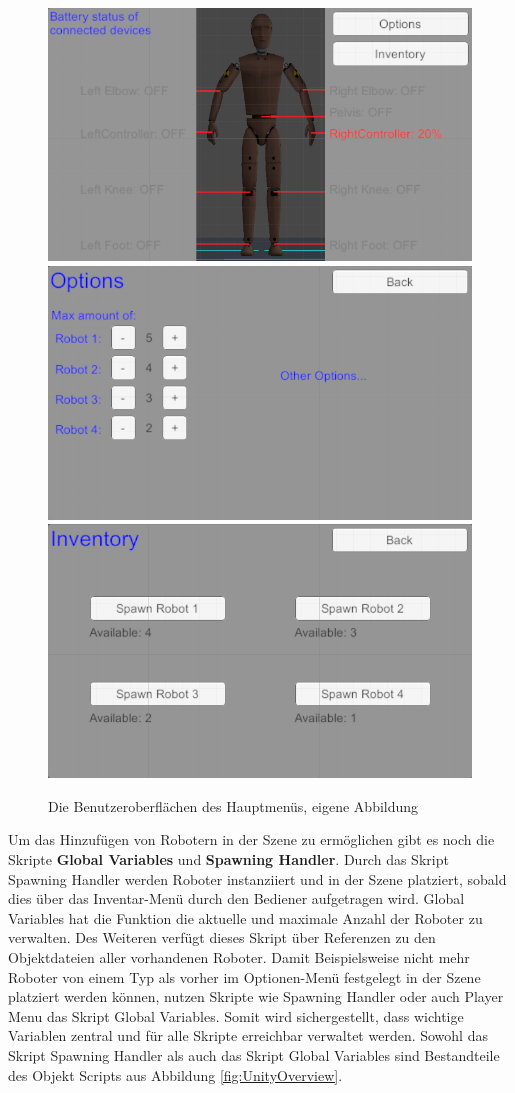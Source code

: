 \begin{figure}[h]
	\centering
	\includegraphics[width=0.45\linewidth]{Bilder/A49_MM1}
	\includegraphics[width=0.45\linewidth]{Bilder/A50_MM2}
	\includegraphics[width=0.45\linewidth]{Bilder/A51_MM3}
	\caption{Die Benutzeroberflächen des Hauptmenüs, eigene Abbildung}
	\label{fig:MainMenu}
\end{figure}
\newline
Um das Hinzufügen von Robotern in der Szene zu ermöglichen gibt es noch die Skripte \textbf{Global Variables} und \textbf{Spawning Handler}. Durch das Skript Spawning Handler werden Roboter instanziiert und in der Szene platziert, sobald dies über das Inventar-Menü durch den Bediener aufgetragen wird. Global Variables hat die Funktion die aktuelle und maximale Anzahl der Roboter zu verwalten. Des Weiteren verfügt dieses Skript über Referenzen zu den Objektdateien aller vorhandenen Roboter. Damit Beispielsweise nicht mehr Roboter von einem Typ als vorher im Optionen-Menü festgelegt in der Szene platziert werden können, nutzen Skripte wie Spawning Handler oder auch Player Menu das Skript Global Variables. Somit wird sichergestellt, dass wichtige Variablen zentral und für alle Skripte erreichbar verwaltet werden. Sowohl das Skript Spawning Handler als auch das Skript Global Variables sind Bestandteile des Objekt Scripts aus Abbildung \ref{fig:UnityOverview}.
\newline\newline
